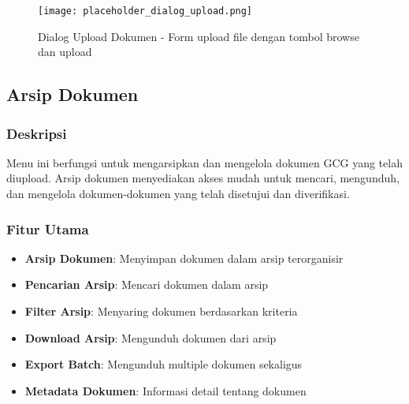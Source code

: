 \documentclass[12pt,a4paper]{article}
\begin{document}
\begin{figure}[H]
\centering
\texttt{[image: placeholder\_dialog\_upload.png]}
\caption{Dialog Upload Dokumen - Form upload file dengan tombol browse dan upload}
\label{fig:dialog_upload}
\end{figure}

\subsection{Arsip Dokumen}

\subsubsection{Deskripsi}
Menu ini berfungsi untuk mengarsipkan dan mengelola dokumen GCG yang telah diupload. Arsip dokumen menyediakan akses mudah untuk mencari, mengunduh, dan mengelola dokumen-dokumen yang telah disetujui dan diverifikasi.

\subsubsection{Fitur Utama}
\begin{itemize}
\item \textbf{Arsip Dokumen}: Menyimpan dokumen dalam arsip terorganisir
\item \textbf{Pencarian Arsip}: Mencari dokumen dalam arsip
\item \textbf{Filter Arsip}: Menyaring dokumen berdasarkan kriteria
\item \textbf{Download Arsip}: Mengunduh dokumen dari arsip
\item \textbf{Export Batch}: Mengunduh multiple dokumen sekaligus
\item \textbf{Metadata Dokumen}: Informasi detail tentang dokumen
\end{itemize}
\end{document}

